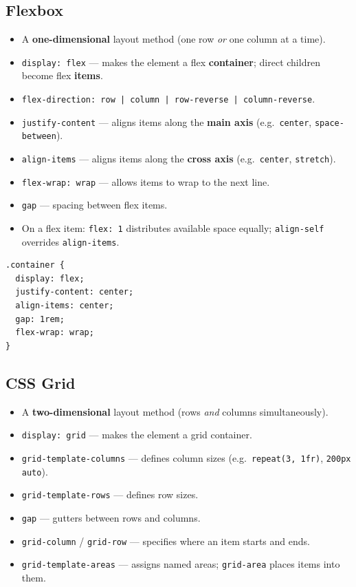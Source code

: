 \documentclass[hidelinks]{article}
\begin{document}
\subsection{Flexbox}
\begin{itemize}
  \item A \textbf{one-dimensional} layout method (one row \emph{or} one column at a time).
  \item \texttt{display: flex} --- makes the element a flex \textbf{container}; direct children become flex \textbf{items}.
  \item \texttt{flex-direction: row | column | row-reverse | column-reverse}.
  \item \texttt{justify-content} --- aligns items along the \textbf{main axis} (e.g.\ \texttt{center}, \texttt{space-between}).
  \item \texttt{align-items} --- aligns items along the \textbf{cross axis} (e.g.\ \texttt{center}, \texttt{stretch}).
  \item \texttt{flex-wrap: wrap} --- allows items to wrap to the next line.
  \item \texttt{gap} --- spacing between flex items.
  \item On a flex item: \texttt{flex: 1} distributes available space equally; \texttt{align-self} overrides \texttt{align-items}.
\end{itemize}

\begin{lstlisting}[language={}, caption={Flexbox centering example}]
.container {
  display: flex;
  justify-content: center;
  align-items: center;
  gap: 1rem;
  flex-wrap: wrap;
}
\end{lstlisting}

\subsection{CSS Grid}
\begin{itemize}
  \item A \textbf{two-dimensional} layout method (rows \emph{and} columns simultaneously).
  \item \texttt{display: grid} --- makes the element a grid container.
  \item \texttt{grid-template-columns} --- defines column sizes (e.g.\ \texttt{repeat(3, 1fr)}, \texttt{200px auto}).
  \item \texttt{grid-template-rows} --- defines row sizes.
  \item \texttt{gap} --- gutters between rows and columns.
  \item \texttt{grid-column} / \texttt{grid-row} --- specifies where an item starts and ends.
  \item \texttt{grid-template-areas} --- assigns named areas; \texttt{grid-area} places items into them.
\end{itemize}
\end{document}
